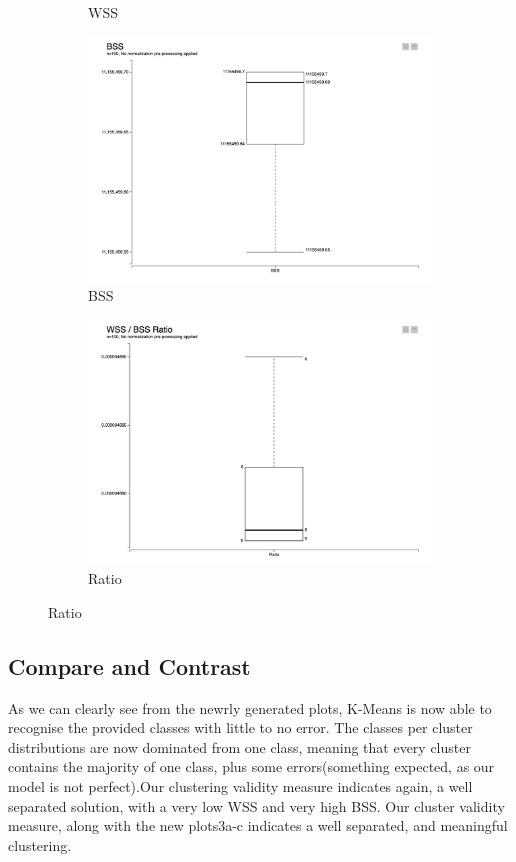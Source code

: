\documentclass[11pt]{article}
\begin{document}
\begin{figure}[H]
\begin{subfigure}{0.3\textwidth}
					\caption{WSS}
					\label{fig:first}
				\end{subfigure}
				\hfill
				\begin{subfigure}{0.3\textwidth}
					\includegraphics[width=\textwidth]{res/t2/t24/t24-BSS-plot}
					\caption{BSS}
					\label{fig:second}
				\end{subfigure}
				\hfill
				\begin{subfigure}{0.3\textwidth}
					\includegraphics[width=\textwidth]{res/t2/t24/t24-Ratio-plot}
					\caption{Ratio}
					\label{fig:third}
				\end{subfigure}
			\end{figure}
			\fi
			
			
		\subsection*{Compare and Contrast}
			As we can clearly see from the newrly generated plots, K-Means is now able to recognise the provided classes with little to no error. The classes per cluster distributions are now dominated from one class, meaning that every cluster contains the majority of one class, plus some errors(something expected, as our model is not perfect).Our clustering validity measure indicates again, a well separated solution, with a very low WSS and very high BSS. Our cluster validity measure, along with the new plots3a-c indicates a well separated, and meaningful clustering.
		
\end{document}
